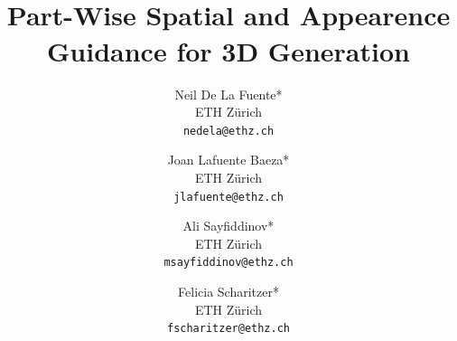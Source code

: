 \documentclass[10pt,twocolumn,letterpaper]{article}
\title{\mbox{\SpaceFlowLogo}\\ Part-Wise Spatial and Appearence Guidance for 3D Generation}
\author{Neil De La Fuente*\\
ETH Z\"urich\\
{\tt\small nedela@ethz.ch}
\and
Joan Lafuente Baeza*\\
ETH Z\"urich\\
{\tt\small jlafuente@ethz.ch}
\and
Ali Sayfiddinov*\\
ETH Z\"urich\\
{\tt\small msayfiddinov@ethz.ch}
\and
Felicia Scharitzer*\\
ETH Z\"urich\\
{\tt\small fscharitzer@ethz.ch}
}
\begin{document}
\maketitle
    



%
%
%



\newpage 

\ %

\newpage

\ %

\newpage

{
    \small
    
    
}

\end{document}
